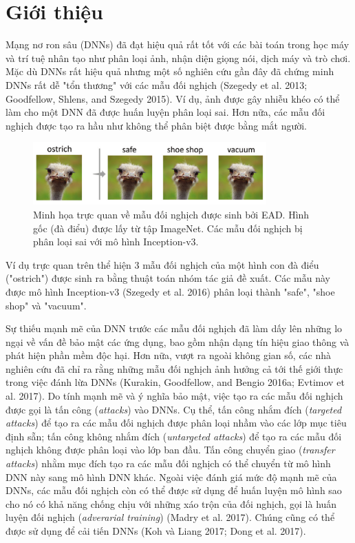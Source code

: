 \chapter{Giới thiệu}
Mạng nơ ron sâu (DNNs) đã đạt hiệu quả rất tốt với các bài toán trong học máy
và trí tuệ nhân tạo như phân loại ảnh, nhận diện giọng nói, dịch máy và trò chơi.
Mặc dù DNNs rất hiệu quả nhưng một số nghiên cứu gần đây đã chứng minh DNNs rất 
dễ  "tổn thương" với các mẫu đối nghịch (Szegedy et al. 2013; Goodfellow, Shlens, 
and Szegedy 2015). Ví dụ, ảnh được gây nhiễu khéo có thể
làm cho một DNN đã được huấn luyện phân loại sai. Hơn nữa, các mẫu đối nghịch
được tạo ra hầu như không thể phân biệt được bằng mắt người. 
\begin{figure}[H] %
    \centering %
    \includegraphics[width=0.8\textwidth]{assets/fig_01.png} 
    \caption{Minh họa trực quan về mẫu đối nghịch được sinh bởi EAD. 
    Hình gốc (đà điểu) được lấy từ tập ImageNet. Các mẫu đối nghịch bị 
    phân loại sai với mô hình Inception-v3.} %
    \label{fig:fg_01}
\end{figure}
Ví dụ trực quan trên thể hiện 3 mẫu đối nghịch của một hình con đà điểu ("ostrich") 
được sinh ra bằng thuật toán nhóm tác giả đề xuất. Các mẫu này được mô hình Inception-v3 
(Szegedy et al. 2016) phân loại thành "safe", "shoe shop" và "vacuum". 

Sự thiếu mạnh mẽ của DNN trước các mẫu đối nghịch đã làm dấy lên những lo ngại 
về vấn đề bảo mật các ứng dụng, bao gồm nhận dạng tín hiệu giao thông 
và phát hiện phần mềm độc hại. Hơn nữa, vượt ra ngoài không gian số, 
các nhà nghiên cứu đã chỉ ra rằng những mẫu đối nghịch ảnh hưởng cả tới thế giới thực trong việc đánh lừa DNNs (Kurakin, Goodfellow, and Bengio 2016a; Evtimov et al. 2017).
Do tính mạnh mẽ và ý nghĩa bảo mật, việc tạo ra các mẫu đối nghịch được gọi là 
tấn công (\textit{attacks}) vào DNNs. Cụ thể, tấn công nhắm đích 
(\textit{targeted attacks}) để tạo ra các mẫu đối nghịch được phân loại nhầm vào các lớp mục tiêu 
định sẵn; tấn công không nhắm đích (\textit{untargeted attacks}) để tạo ra các mẫu đối nghịch không được phân loại vào lớp ban đầu. Tấn công 
chuyển giao (\textit{transfer attacks}) nhằm mục đích tạo ra các mẫu đối nghịch có thể chuyển 
từ mô hình DNN này sang mô hình DNN khác. Ngoài việc đánh giá mức độ mạnh mẽ của DNNs,
các mẫu đối nghịch còn có thể được sử dụng để huấn luyện mô hình sao cho nó có khả năng chống chịu 
với những xáo trộn của đối nghịch, gọi là huấn luyện đối nghịch (\textit{adverarial training}) 
(Madry et al. 2017). Chúng cũng có thể được sử dụng để cải tiến DNNs (Koh và Liang 2017;
Dong et al. 2017). 

